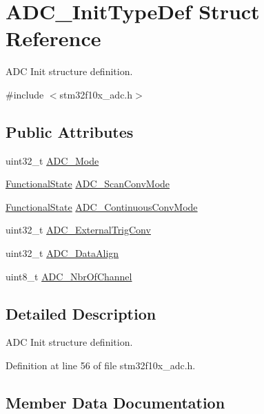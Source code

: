 \hypertarget{struct_a_d_c___init_type_def}{}\section{A\+D\+C\+\_\+\+Init\+Type\+Def Struct Reference}
\label{struct_a_d_c___init_type_def}


A\+DC Init structure definition.  




{\ttfamily \#include $<$stm32f10x\+\_\+adc.\+h$>$}

\subsection*{Public Attributes}
\begin{DoxyCompactItemize}
\item 
uint32\+\_\+t \hyperlink{struct_a_d_c___init_type_def_a0f9ec17ad585d66a54625213062c9260}{A\+D\+C\+\_\+\+Mode}
\item 
\hyperlink{group___exported__types_gac9a7e9a35d2513ec15c3b537aaa4fba1}{Functional\+State} \hyperlink{struct_a_d_c___init_type_def_aaf44f54f22ab40bf8fae01f075aa4c87}{A\+D\+C\+\_\+\+Scan\+Conv\+Mode}
\item 
\hyperlink{group___exported__types_gac9a7e9a35d2513ec15c3b537aaa4fba1}{Functional\+State} \hyperlink{struct_a_d_c___init_type_def_a2149036a332281e70a36879a2396b8d1}{A\+D\+C\+\_\+\+Continuous\+Conv\+Mode}
\item 
uint32\+\_\+t \hyperlink{struct_a_d_c___init_type_def_ae5d0c48e70c2a39355b7ab0cc1df8310}{A\+D\+C\+\_\+\+External\+Trig\+Conv}
\item 
uint32\+\_\+t \hyperlink{struct_a_d_c___init_type_def_a622e89d8fba3900f20aaf40d5560ab7b}{A\+D\+C\+\_\+\+Data\+Align}
\item 
uint8\+\_\+t \hyperlink{struct_a_d_c___init_type_def_ad6f39a12ac32a2767085ac94e9338bc3}{A\+D\+C\+\_\+\+Nbr\+Of\+Channel}
\end{DoxyCompactItemize}


\subsection{Detailed Description}
A\+DC Init structure definition. 

Definition at line 56 of file stm32f10x\+\_\+adc.\+h.



\subsection{Member Data Documentation}
\mbox{\label{struct_a_d_c___init_type_def_a2149036a332281e70a36879a2396b8d1}} 
